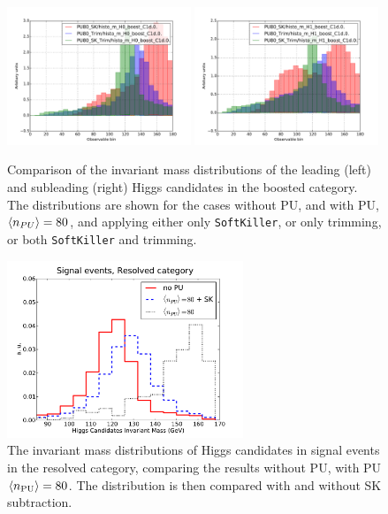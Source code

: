 \begin{figure}[t]
  \begin{center}
      \includegraphics[width=0.49\textwidth]{plots/histo_m_H0_boost.pdf}
      \includegraphics[width=0.49\textwidth]{plots/histo_m_H1_boost.pdf}
  \caption{\small
    Comparison of the invariant mass distributions of the leading (left)
    and subleading (right) Higgs candidates in the boosted category.
    The distributions are shown for the cases without PU, and with
    PU, $\left\langle n_{PU}\right\rangle=80$, and applying either only {\tt SoftKiller},
    or only trimming, or both {\tt SoftKiller} and trimming.
}
\label{fig:m_H_PU_MitiCompare}
\end{center}
\end{figure}


\begin{figure}[t]
  \begin{center}
  \includegraphics[width=0.63\textwidth]{plots/m_htot_res_signal_PUnoSK.pdf}
    \caption{\small
    The invariant mass distributions of Higgs candidates in signal
events in the resolved category, comparing the results without PU,
with PU $\left\langle n_{\rm PU}\right\rangle=80$. The distribution is then compared with and without SK subtraction.
}
\label{fig:PUvalidation}
\end{center}
\end{figure}

